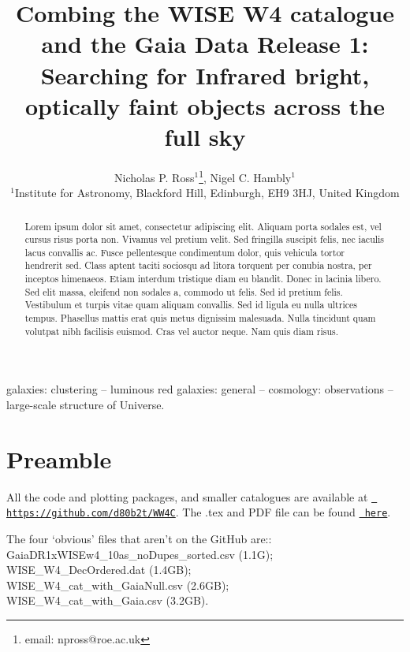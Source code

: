 \documentclass[usenatbib]{mn2e}
\begin{document}
\title[WISE W4s not in Gaia]
{Combing the WISE W4 catalogue and the
  Gaia Data Release 1: Searching for Infrared bright, optically faint
  objects across the full sky}
\author[Ross \& Hambly]
{Nicholas P. Ross$^{1}$\thanks{email: npross@roe.ac.uk}, 
  Nigel C. Hambly$^{1}$\\
$^1$Institute for Astronomy, Blackford Hill, Edinburgh, EH9 3HJ, United Kingdom \\ 
}


\maketitle
\begin{abstract}
 Lorem ipsum dolor sit amet, consectetur adipiscing elit. Aliquam
porta sodales est, vel cursus risus porta non. Vivamus vel pretium
velit. Sed fringilla suscipit felis, nec iaculis lacus convallis
ac. Fusce pellentesque condimentum dolor, quis vehicula tortor
hendrerit sed. Class aptent taciti sociosqu ad litora torquent per
conubia nostra, per inceptos himenaeos. Etiam interdum tristique diam
eu blandit. Donec in lacinia libero.
Sed elit massa, eleifend non sodales a, commodo ut felis. Sed id
pretium felis. Vestibulum et turpis vitae quam aliquam convallis. Sed
id ligula eu nulla ultrices tempus. Phasellus mattis erat quis metus
dignissim malesuada. Nulla tincidunt quam volutpat nibh facilisis
euismod. Cras vel auctor neque. Nam quis diam risus.
\end{abstract}
\begin{keywords}
galaxies: clustering -- luminous red galaxies: general -- cosmology: 
observations -- large-scale structure of Universe.
\end{keywords}



\section*{Preamble}
All the code and plotting packages, and smaller catalogues are
available at \href{https://github.com/d80b2t/WW4C}{{\tt
https://github.com/d80b2t/WW4C}}.  The .tex and PDF file can be found
\href{https://github.com/d80b2t/WW4C/tree/master/LaTeX/GaiaDR1_catalog}{{\tt
here}}.

\noindent
The four `obvious' files that aren't on the GitHub are:: \\
GaiaDR1xWISEw4\_10as\_noDupes\_sorted.csv (1.1G); \\
WISE\_W4\_DecOrdered.dat (1.4GB);\\
WISE\_W4\_cat\_with\_GaiaNull.csv  (2.6GB);\\
WISE\_W4\_cat\_with\_Gaia.csv  (3.2GB).\\
\end{document}
